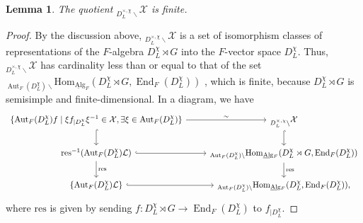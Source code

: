 \documentclass[a4paper,10pt]{amsart}
\theoremstyle{plain}
\newtheorem{lemma}[theorem]{Lemma}
\theoremstyle{definition}
\theoremstyle{remark}
\def\Alg{\ul{\mr{Al}}\mr{g}}
\def\ul#1{\underline{#1}}
\def\mr#1{\mathrm{#1}}
\def\Xcal{\mathcal{X}}
\def\Lcal{\mathcal{L}}
\newcommand{\res}{\mathrm{res}}
\newcommand{\bD}{D_L}
\renewcommand{\hom}{\mr{Hom}}
\DeclareMathOperator{\Aut}{Aut}
\DeclareMathOperator{\End}{End}
\begin{document}
\begin{lemma}\label{lemma: finiteness of quotXcal}
The quotient \({}_{\bD^{\times, \chi} \backslash} \Xcal\) is finite.
\end{lemma}
\begin{proof}
By the discussion above, \({}_{\bD^{\times, \chi} \backslash} \Xcal\) is a set of isomorphism classes of representations of the \(F\)-algebra \(\bD^\chi \rtimes G\) into the \(F\)-vector space \(\bD^\chi\). %
Thus, \({}_{\bD^{\times, \chi} \backslash} \Xcal\) has cardinality less than or equal to that of the set \({}_{\Aut_F(\bD^\chi) \backslash}\hom_{\Alg_F}(\bD^\chi \rtimes G, \End_F(\bD^\chi))\)%
, which is finite, because \(\bD^\chi \rtimes G\) is semisimple and finite-dimensional. In a diagram, we have
\[ \begin{tikzcd}%
         \{\Aut_F(\bD^\chi)f \mid \xi f_{|\bD^\chi} \xi^{-1} \in \Xcal, \exists \xi \in \Aut_F(\bD^\chi)\} \arrow[d, hook] \arrow[r, "{{\sim}}"] & {}_{\bD^{\times, \chi} \backslash} \Xcal  \arrow[d, hook] %
         \\
         \res^{-1}(\Aut_F(\bD^\chi) \Lcal) \arrow[d, "{{\res}}"] \arrow[r, hook] & {}_{\Aut_F(\bD^\chi) \backslash}\hom_{\Alg_F}(\bD^\chi \rtimes G, \End_F(\bD^\chi)) \arrow[d, "{{\res}}"] \\
         \{\Aut_F(\bD^\chi) \Lcal\}\arrow[r, hook]& {}_{\Aut_F(\bD^\chi) \backslash}\hom_{\Alg_F}(\bD^\chi, \End_F(\bD^\chi)),
    \end{tikzcd}
\]
where \(\res\) is given by sending \(f \colon \bD^\chi \rtimes G \to \End_F(\bD^\chi)\) to \(f_{|\bD^\chi}\).    
\end{proof}
\end{document}
